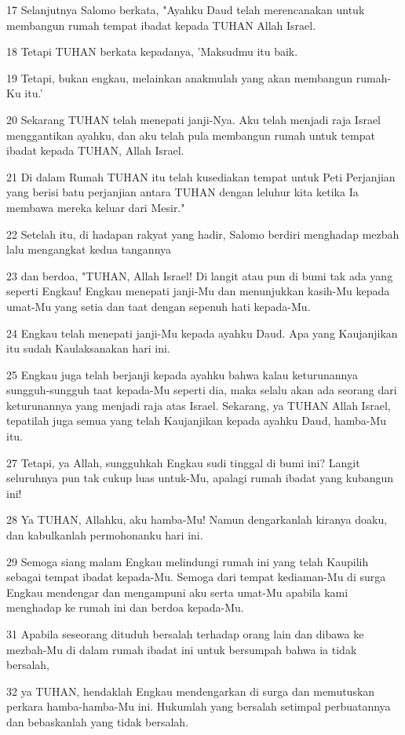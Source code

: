 \par 17 Selanjutnya Salomo berkata, "Ayahku Daud telah merencanakan untuk membangun rumah tempat ibadat kepada TUHAN Allah Israel.
\par 18 Tetapi TUHAN berkata kepadanya, 'Maksudmu itu baik.
\par 19 Tetapi, bukan engkau, melainkan anakmulah yang akan membangun rumah-Ku itu.'
\par 20 Sekarang TUHAN telah menepati janji-Nya. Aku telah menjadi raja Israel menggantikan ayahku, dan aku telah pula membangun rumah untuk tempat ibadat kepada TUHAN, Allah Israel.
\par 21 Di dalam Rumah TUHAN itu telah kusediakan tempat untuk Peti Perjanjian yang berisi batu perjanjian antara TUHAN dengan leluhur kita ketika Ia membawa mereka keluar dari Mesir."
\par 22 Setelah itu, di hadapan rakyat yang hadir, Salomo berdiri menghadap mezbah lalu mengangkat kedua tangannya
\par 23 dan berdoa, "TUHAN, Allah Israel! Di langit atau pun di bumi tak ada yang seperti Engkau! Engkau menepati janji-Mu dan menunjukkan kasih-Mu kepada umat-Mu yang setia dan taat dengan sepenuh hati kepada-Mu.
\par 24 Engkau telah menepati janji-Mu kepada ayahku Daud. Apa yang Kaujanjikan itu sudah Kaulaksanakan hari ini.
\par 25 Engkau juga telah berjanji kepada ayahku bahwa kalau keturunannya sungguh-sungguh taat kepada-Mu seperti dia, maka selalu akan ada seorang dari keturunannya yang menjadi raja atas Israel. Sekarang, ya TUHAN Allah Israel, tepatilah juga semua yang telah Kaujanjikan kepada ayahku Daud, hamba-Mu itu.
\par 27 Tetapi, ya Allah, sungguhkah Engkau sudi tinggal di bumi ini? Langit seluruhnya pun tak cukup luas untuk-Mu, apalagi rumah ibadat yang kubangun ini!
\par 28 Ya TUHAN, Allahku, aku hamba-Mu! Namun dengarkanlah kiranya doaku, dan kabulkanlah permohonanku hari ini.
\par 29 Semoga siang malam Engkau melindungi rumah ini yang telah Kaupilih sebagai tempat ibadat kepada-Mu. Semoga dari tempat kediaman-Mu di surga Engkau mendengar dan mengampuni aku serta umat-Mu apabila kami menghadap ke rumah ini dan berdoa kepada-Mu.
\par 31 Apabila seseorang dituduh bersalah terhadap orang lain dan dibawa ke mezbah-Mu di dalam rumah ibadat ini untuk bersumpah bahwa ia tidak bersalah,
\par 32 ya TUHAN, hendaklah Engkau mendengarkan di surga dan memutuskan perkara hamba-hamba-Mu ini. Hukumlah yang bersalah setimpal perbuatannya dan bebaskanlah yang tidak bersalah.
